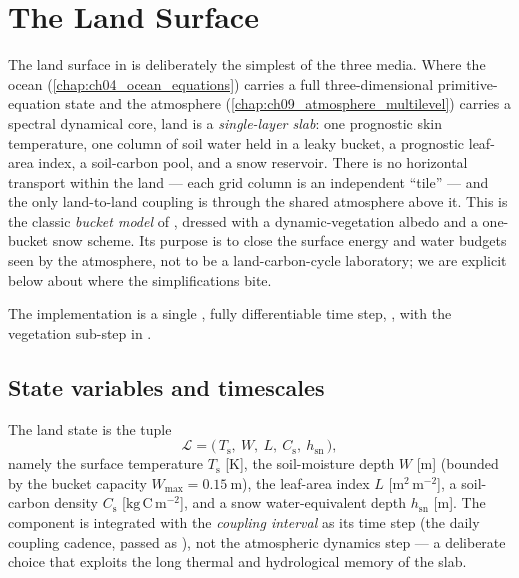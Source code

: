 \chapter{The Land Surface}\label{chap:ch12_land}

\providecommand{\Tsfc}{T_{\mathrm s}}        %
\providecommand{\Tair}{T_{\mathrm a}}        %
\providecommand{\Wsoil}{W}                    %
\providecommand{\Wmax}{W_{\max}}              %
\providecommand{\Rnet}{R_{\mathrm n}}         %
\providecommand{\Hsen}{H}                      %
\providecommand{\LE}{L_v E}                    %
\providecommand{\lai}{L}                       %
\providecommand{\Topt}{T_{\mathrm{opt}}}      %

The land surface in \model{} is deliberately the simplest of the three media.
Where the ocean (\ref{chap:ch04_ocean_equations}) carries a full
three-dimensional primitive-equation state and the atmosphere
(\ref{chap:ch09_atmosphere_multilevel}) carries a spectral dynamical core, land is a
\emph{single-layer slab}: one prognostic skin temperature, one column of soil
water held in a leaky bucket, a prognostic leaf-area index, a soil-carbon pool,
and a snow reservoir. There is no horizontal transport within the land --- each
grid column is an independent ``tile'' --- and the only land-to-land coupling is
through the shared atmosphere above it. This is the classic \emph{bucket model}
of \citet{manabe1969}, dressed with a dynamic-vegetation albedo and a one-bucket snow scheme.
Its purpose is to close the surface energy and water budgets seen by the
atmosphere, not to be a land-carbon-cycle laboratory; we are explicit below about
where the simplifications bite.

The implementation is a single \jax{}, fully differentiable time step,
, with the vegetation
sub-step in .

\section{State variables and timescales}

The land state is the tuple
\begin{equation}
  \mathcal{L} = \bigl(\,\Tsfc,\ \Wsoil,\ \lai,\ C_{\mathrm s},\ h_{\mathrm{sn}}\,\bigr),
\end{equation}
namely the surface temperature $\Tsfc$ [K], the soil-moisture depth $\Wsoil$ [m]
(bounded by the bucket capacity $\Wmax = 0.15\ \mathrm{m}$), the leaf-area index
$\lai$ [$\mathrm{m^2\,m^{-2}}$], a soil-carbon density $C_{\mathrm s}$
[$\mathrm{kg\,C\,m^{-2}}$], and a snow water-equivalent depth $h_{\mathrm{sn}}$
[m]. The component is integrated with the \emph{coupling interval} as its time
step (the daily coupling cadence, passed as ), not the atmospheric
dynamics step --- a deliberate choice that exploits the long thermal and
hydrological memory of the slab.


